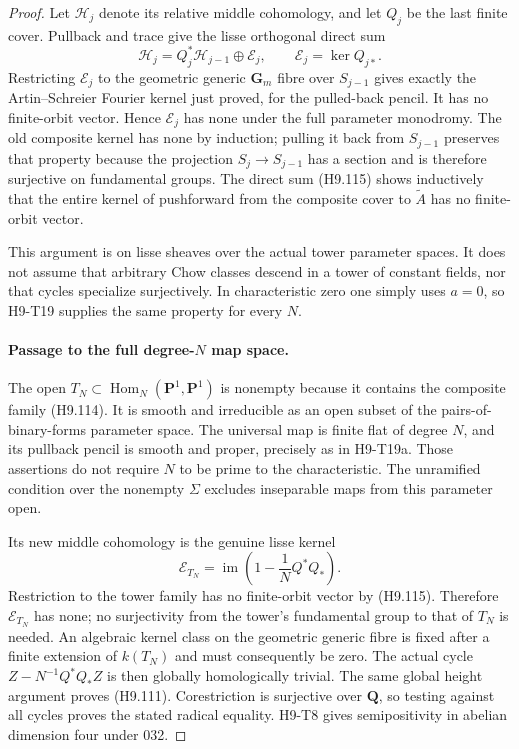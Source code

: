 \begin{proof}
Let $\mathscr H_j$ denote its relative middle cohomology,
and let $Q_j$ be the last finite cover. Pullback and
trace give the lisse orthogonal direct sum
\[
 \mathscr H_j=Q_j^*\mathscr H_{j-1}\oplus\mathscr E_j,
      \qquad \mathscr E_j=\ker Q_{j*}.
                                                               \tag{H9.115}
\]
Restricting $\mathscr E_j$ to the geometric generic
$\mathbf G_m$ fibre over $S_{j-1}$ gives exactly the
Artin--Schreier Fourier kernel just proved, for the
pulled-back pencil. It has no finite-orbit vector.
Hence $\mathscr E_j$ has none under the full parameter
monodromy. The old composite kernel has none by
induction; pulling it back from $S_{j-1}$ preserves that
property because the projection $S_j\to S_{j-1}$ has
a section and is therefore surjective on fundamental
groups. The direct sum (H9.115) shows inductively that
the entire kernel of pushforward from the composite
cover to $\widetilde A$ has no finite-orbit vector.

This argument is on lisse sheaves over the actual tower
parameter spaces. It does not assume that arbitrary
Chow classes descend in a tower of constant fields, nor
that cycles specialize surjectively. In characteristic
zero one simply uses $a=0$, so H9-T19 supplies the same
property for every $N$.

\paragraph{Passage to the full degree-$N$ map space.}
The open $T_N\subset\operatorname{Hom}_N(\mathbf P^1,
\mathbf P^1)$ is nonempty because it contains the
composite family (H9.114). It is smooth and irreducible
as an open subset of the pairs-of-binary-forms parameter
space. The universal map is finite flat of degree $N$,
and its pullback pencil is smooth and proper, precisely
as in H9-T19a. Those assertions do not require
$N$ to be prime to the characteristic. The unramified
condition over the nonempty $\Sigma$ excludes
inseparable maps from this parameter open.

Its new middle cohomology is the genuine lisse kernel
\[
  \mathscr E_{T_N}
        =\operatorname{im}\left(1-\frac1N Q^*Q_*\right).
                                                               \tag{H9.116}
\]
Restriction to the tower family has no finite-orbit
vector by (H9.115). Therefore $\mathscr E_{T_N}$ has
none; no surjectivity from the tower's fundamental
group to that of $T_N$ is needed. An algebraic kernel
class on the geometric generic fibre is fixed after a
finite extension of $k(T_N)$ and must consequently be
zero. The actual cycle
$Z-N^{-1}Q^*Q_*Z$ is then globally homologically
trivial. The same global height argument proves
(H9.111). Corestriction is surjective over $\mathbf Q$,
so testing against all cycles proves the stated radical
equality. H9-T8 gives semipositivity in abelian dimension
four under 032.
\end{proof}

